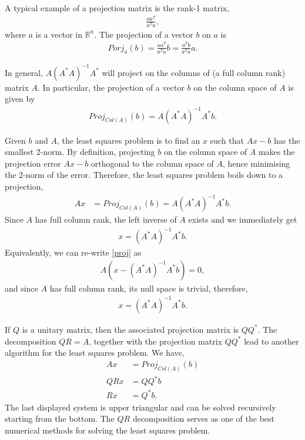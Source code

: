 \documentclass{amsart}
\theoremstyle{plain}
\numberwithin{equation}{section}
\begin{document}
A typical example of a projection matrix is the 
rank-1 matrix,
\begin{align*}
\frac{aa^T}{a^Ta},
\end{align*}
where $a$ is a vector in $\mathbb{R}^n$. The projection of a 
vector $b$ on $a$ is
\begin{align*}
Porj_{a}(b) = \frac{aa^T}{a^Ta} b = \frac{a^Tb}{a^Ta} a.
\end{align*}

In general, $A(A^*A)^{-1}A^*$ will project on the 
columns of (a full column rank) matrix $A$. In particular, the 
projection of a vector $b$ on the column space of $A$ is given 
by
\begin{align*}
Proj_{Col(A)}(b) = A(A^*A)^{-1}A^*b.
\end{align*}

Given $b$ and $A$, the least squares problem is to
find an $x$ such that $Ax-b$ has the smallest 2-norm.
By definition, projecting $b$ on the column space of $A$
makes the projection error $Ax-b$ orthogonal to the column 
space of $A$, hence minimising the 2-norm of the 
error. Therefore, the least squares problem boils down to
a projection,
\begin{align}
Ax &= Proj_{Col(A)}(b)= A(A^*A)^{-1}A^*b.
\label{proj}
\end{align}
Since $A$ has full column rank, the left inverse of $A$ exists and 
we immediately get 
\begin{align*}
x = (A^*A)^{-1}A^*b.
\end{align*}
Equivalently, we can re-write \eqref{proj} as 
\begin{align*}
A\left(x - (A^*A)^{-1}A^*b\right) = 0,
\end{align*}
and since $A$ has full column rank, its null space is trivial,
therefore,
\begin{align*}
x = (A^*A)^{-1}A^*b.
\end{align*}

If $Q$ is a unitary matrix, then the associated projection matrix 
is $QQ^*$. The decomposition $QR=A$, together with the projection matrix 
$QQ^*$ lead to another algorithm for the least squares problem. We have,
\begin{align*}
Ax &= Proj_{Col(A)}(b)\\
QRx &= QQ^*b\\
Rx &= Q^*b.
\end{align*}
The last displayed system is upper triangular and can be solved recursively 
starting from the bottom. The $QR$ decomposition serves 
as one of the best numerical methods for solving the least squares problem. 
\end{document}
